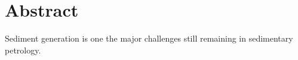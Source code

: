 \chapter{Abstract}                                 \label{ch:abstract}

Sediment generation is one the major challenges still remaining in sedimentary petrology. %


\instructionsabstract


\cleardoublepage

